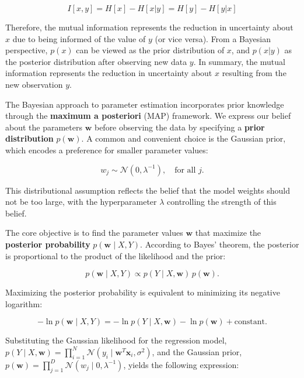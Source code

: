 \documentclass[../main.tex]{subfiles}
\begin{document}
\begin{equation*}
I[x,y] = H[x] - H[x|y] = H[y] - H[y|x]
\end{equation*}

Therefore, the mutual information represents the reduction in uncertainty about $x$ due to being informed of the value of $y$ (or vice versa). From a Bayesian perspective, $p(x)$ can be viewed as the prior distribution of $x$, and $p(x|y)$ as the posterior distribution after observing new data $y$. In summary, the mutual information represents the reduction in uncertainty about $x$ resulting from the new observation $y$.

The Bayesian approach to parameter estimation incorporates prior knowledge through the \textbf{maximum a posteriori} (MAP) framework. We express our belief about the parameters $\mathbf{w}$ before observing the data by specifying a \textbf{prior distribution} $p(\mathbf{w})$. A common and convenient choice is the Gaussian prior, which encodes a preference for smaller parameter values:

\begin{equation*}
w_j \sim \mathcal{N}(0, \lambda^{-1}), \quad \text{for all } j.
\end{equation*}

This distributional assumption reflects the belief that the model weights should not be too large, with the hyperparameter $\lambda$ controlling the strength of this belief.

The core objective is to find the parameter values $\mathbf{w}$ that maximize the \textbf{posterior probability} $p(\mathbf{w} \mid X, Y)$. According to Bayes' theorem, the posterior is proportional to the product of the likelihood and the prior:

\begin{equation*}
p(\mathbf{w} \mid X, Y) \propto p(Y \mid X, \mathbf{w}) \, p(\mathbf{w}).
\end{equation*}

Maximizing the posterior probability is equivalent to minimizing its negative logarithm:

\begin{equation*}
-\ln p(\mathbf{w} \mid X, Y) = -\ln p(Y \mid X, \mathbf{w}) - \ln p(\mathbf{w}) + \text{constant}.
\end{equation*}

Substituting the Gaussian likelihood for the regression model, $p(Y \mid X, \mathbf{w}) = \prod_{i=1}^N \mathcal{N}(y_i \mid \mathbf{w}^T \mathbf{x}_i, \sigma^2)$, and the Gaussian prior, $p(\mathbf{w}) = \prod_{j=1}^D \mathcal{N}(w_j \mid 0, \lambda^{-1})$, yields the following expression:
\end{document}
